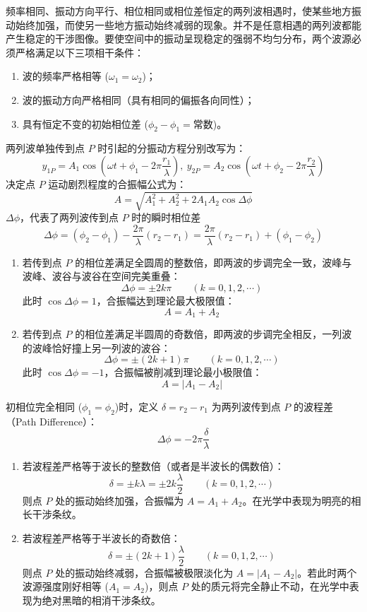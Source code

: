 \documentclass[lang=cn,11pt]{elegantbook}
\begin{document}
\begin{definition}[波的干涉]
频率相同、振动方向平行、相位相同或相位差恒定的两列波相遇时，使某些地方振动始终加强，而使另一些地方振动始终减弱的现象。并不是任意相遇的两列波都能产生稳定的干涉图像。要使空间中的振动呈现稳定的强弱不均匀分布，两个波源必须严格满足以下三项相干条件：
\begin{enumerate}
\item 波的频率严格相等 ($\omega_1 = \omega_2$)；
\item 波的振动方向严格相同（具有相同的偏振各向同性）；
\item 具有恒定不变的初始相位差 ($\phi_2 - \phi_1 = \text{常数}$)。
\end{enumerate}
两列波单独传到点 $P$ 时引起的分振动方程分别改写为：$$y_{1P} = A_1 \cos\left(\omega t + \phi_1 - 2\pi \frac{r_1}{\lambda}\right),~y_{2P} = A_2 \cos\left(\omega t + \phi_2 - 2\pi \frac{r_2}{\lambda}\right)$$
决定点 $P$ 运动剧烈程度的合振幅公式为：$$\boxed{A = \sqrt{A_1^2 + A_2^2 + 2A_1 A_2 \cos\Delta\phi}}$$ $\Delta\phi$，代表了两列波传到点 $P$ 时的瞬时相位差$$\Delta\phi = (\phi_2 - \phi_1) - \frac{2\pi}{\lambda}(r_2 - r_1)= \frac{2\pi}{\lambda}(r_2 - r_1) + (\phi_1 - \phi_2)$$
\begin{enumerate}
    \item 若传到点 $P$ 的相位差满足全圆周的整数倍，即两波的步调完全一致，波峰与波峰、波谷与波谷在空间完美重叠：$$\Delta\phi = \pm 2k\pi \qquad (k = 0,1,2,\cdots)$$此时 $\cos\Delta\phi = 1$，合振幅达到理论最大极限值：$$\boxed{A = A_1 + A_2}$$
    \item 若传到点 $P$ 的相位差满足半圆周的奇数倍，即两波的步调完全相反，一列波的波峰恰好撞上另一列波的波谷：$$\Delta\phi = \pm (2k + 1)\pi \qquad (k = 0,1,2,\cdots)$$此时 $\cos\Delta\phi = -1$，合振幅被削减到理论最小极限值：$$\boxed{A = |A_1 - A_2|}$$
\end{enumerate}
初相位完全相同 ($\phi_1 = \phi_2$)时，定义 $\delta = r_2 - r_1$ 为两列波传到点 $P$ 的波程差（Path Difference）：$$\Delta\phi = -2\pi \frac{\delta}{\lambda}$$
 \begin{enumerate}
    \item 若波程差严格等于波长的整数倍（或者是半波长的偶数倍）：$$\boxed{\delta = \pm k\lambda = \pm 2k \frac{\lambda}{2} \qquad (k = 0,1,2,\cdots)}$$则点 $P$ 处的振动始终加强，合振幅为 $A = A_1 + A_2$。在光学中表现为明亮的相长干涉条纹。
    \item 若波程差严格等于半波长的奇数倍：$$\boxed{\delta = \pm (2k + 1)\frac{\lambda}{2} \qquad (k = 0,1,2,\cdots)}$$则点 $P$ 处的振动始终减弱，合振幅被极限淡化为 $A = |A_1 - A_2|$。若此时两个波源强度刚好相等 ($A_1 = A_2$)，则点 $P$ 处的质元将完全静止不动，在光学中表现为绝对黑暗的相消干涉条纹。
\end{enumerate}
\end{definition}
\end{document}
